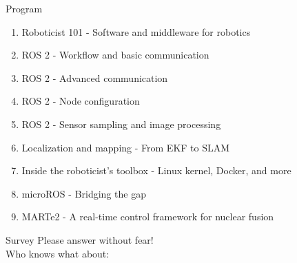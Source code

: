 \begin{frame}{Program}
	\begin{enumerate}
		\item Roboticist 101 - Software and middleware for robotics
		\item ROS 2 - Workflow and basic communication
		\item ROS 2 - Advanced communication
		\item ROS 2 - Node configuration
		\item ROS 2 - Sensor sampling and image processing
		\item Localization and mapping - From EKF to SLAM
		\item Inside the roboticist's toolbox - Linux kernel, Docker, and more
		\item microROS - Bridging the gap
		\item MARTe2 - A real-time control framework for nuclear fusion
	\end{enumerate}
\end{frame}

\begin{frame}{Survey}
  Please answer without fear!\\
  \bigskip
  Who knows what about:
  \begin{itemize}
  \end{itemize}
\end{frame}

